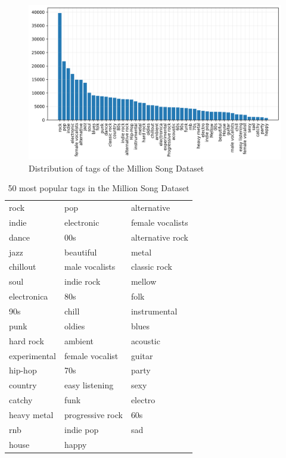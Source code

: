 \begin{figure}
    \centering
    \includegraphics[width=\columnwidth]{figs/tag_stats_msd.png}
    \caption{Distribution of tags of the Million Song Dataset}
    \label{fig:tag_stats_msd}
\end{figure}


\begin{table}[t]
    \centering
    \begin{tabular}{lll}\toprule
        rock & pop & alternative \\
        indie & electronic & female vocalists \\
        dance & 00s & alternative rock \\
        jazz & beautiful & metal \\
        chillout & male vocalists & classic rock \\
        soul & indie rock & mellow \\
        electronica & 80s & folk \\
        90s & chill & instrumental \\
        punk & oldies & blues \\
        hard rock & ambient & acoustic \\
        experimental & female vocalist & guitar \\
        hip-hop & 70s & party \\
        country & easy listening & sexy \\
        catchy & funk & electro \\
        heavy metal & progressive rock & 60s \\
        rnb & indie pop & sad \\
        house & happy & \\
        \bottomrule
    \end{tabular}
    \caption{50 most popular tags in the Million Song Dataset}
    \label{tab:msd_tags}
\end{table}



